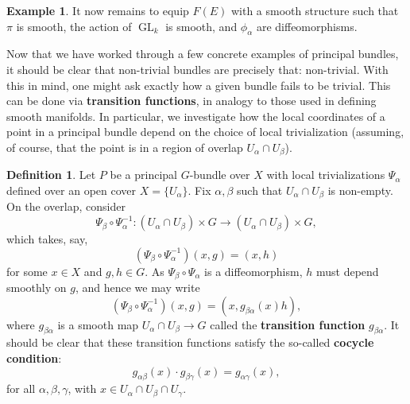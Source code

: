 \documentclass{book}
\newcommand{\R}{\mathbb{R}}
\DeclareMathOperator{\GL}{GL}
\theoremstyle{plain}
\theoremstyle{definition}
\newtheorem{defn}{Definition}
\newtheorem{exmp}{Example}
\theoremstyle{remark}
\begin{document}
\begin{exmp}
    It now remains to equip $F(E)$ with a smooth structure such that $\pi$ is smooth, the action of $\GL_k$ is smooth, and $\phi_\alpha$ are
    diffeomorphisms. 
    

\end{exmp}

Now that we have worked through a few concrete examples of principal bundles, it should be clear that non-trivial bundles are precisely that: non-trivial.
With this in mind, one might ask exactly how a
given bundle fails to be trivial. This can be done via \textbf{transition functions}, in analogy to those used in defining smooth manifolds.
In particular, we investigate how the local coordinates of a point in a principal bundle depend on the choice of local trivialization (assuming, of
course, that the point is in a region of overlap $U_\alpha\cap U_\beta$).

\begin{defn}
    Let $P$ be a principal $G$-bundle over $X$ with local trivializations $\Psi_\alpha$ defined over an open cover $X=\{U_\alpha\}$.
    Fix $\alpha,\beta$ such that $U_\alpha\cap U_\beta$ is non-empty. 
    On the overlap, consider
    \[\Psi_\beta\circ\Psi_\alpha^{-1}:(U_\alpha\cap U_\beta)\times G\to (U_\alpha\cap U_\beta)\times G,\]
    which takes, say,
    \[(\Psi_\beta\circ\Psi_\alpha^{-1})(x,g)=(x,h)\]
    for some $x\in X$ and $g,h\in G$. As $\Psi_\beta\circ\Psi_\alpha$ is a diffeomorphism, $h$ must depend smoothly on $g$,
    and hence we may write
    \[(\Psi_\beta\circ\Psi_\alpha^{-1})(x,g)=(x,g_{\beta\alpha}(x)h),\]
    where $g_{\beta\alpha}$ is a smooth map $U_\alpha\cap U_\beta\to G$ called the \textbf{transition function} $g_{\beta\alpha}$. 
    It should be clear that these transition functions satisfy the so-called \textbf{cocycle condition}:
    \[g_{\alpha\beta}(x)\cdot g_{\beta\gamma}(x)=g_{\alpha\gamma}(x),\]
    for all $\alpha,\beta,\gamma$, with $x\in U_\alpha\cap U_\beta\cap U_\gamma$.
\end{defn}
\end{document}
